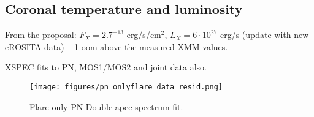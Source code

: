 \documentclass[twocolumn]{aastex631}
\begin{document}





\subsection{Coronal temperature and luminosity}

From the proposal: $F_X=2.7^{-13}$ erg/s/cm$^2$, $L_X=6\cdot10^27$ erg/s (update with new eROSITA data) -- 1 oom above the measured XMM values.
\begin{table*}
\footnotesize
    \caption{XSPEC fits to PN, MOS1/MOS2 and joint data also.}
    
        \label{tab:specfit}
\end{table*}

\begin{figure}
    \begin{centering}
        \texttt{[image: figures/pn\_onlyflare\_data\_resid.png]}
        \caption{
         Flare only PN Double apec spectrum fit.
        }
        \label{fig:spec_pn_onlyflare}
    \end{centering}
\end{figure}
\end{document}
